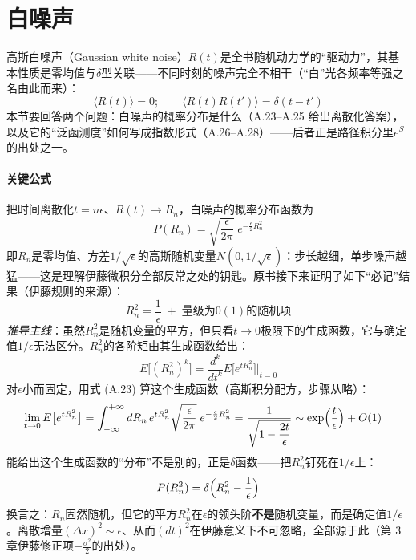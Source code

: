 \section{白噪声}

高斯白噪声（Gaussian white noise）$R(t)$是全书随机动力学的“驱动力”，其基本性质是零均值与$\delta$型关联——不同时刻的噪声完全不相干（“白”光各频率等强之名由此而来）：
\begin{equation*}
\langle R(t)\rangle=0;\qquad
\langle R(t)R(t')\rangle=\delta(t-t')
\end{equation*}
本节要回答两个问题：白噪声的概率分布是什么（A.23--A.25 给出离散化答案），以及它的“泛函测度”如何写成指数形式（A.26--A.28）——后者正是路径积分里$e^{S}$的出处之一。

\paragraph{关键公式}
把时间离散化$t=n\epsilon$、$R(t)\to R_n$，白噪声的概率分布函数为
\begin{equation*}
P(R_n)=\sqrt{\frac{\epsilon}{2\pi}}\;e^{-\frac{\epsilon}{2}R_n^2}
\tag{A.23}
\end{equation*}
即$R_n$是零均值、方差$1/\sqrt{\epsilon}$的高斯随机变量$N(0,1/\sqrt{\epsilon})$：步长越细，单步噪声越猛——这是理解伊藤微积分全部反常之处的钥匙。原书接下来证明了如下“必记”结果（伊藤规则的来源）：
\begin{equation*}
R_n^2=\frac{1}{\epsilon}\;+\;\text{量级为}0(1)\text{的随机项}
\tag{A.24}
\end{equation*}
\emph{推导主线}：虽然$R_n^2$是随机变量的平方，但只看$t\to0$极限下的生成函数，它与确定值$1/\epsilon$无法区分。$R_n^2$的各阶矩由其生成函数给出：
\begin{equation*}
E\bigl[(R_n^2)^k\bigr]=\frac{d^k}{dt^k}E\bigl[e^{tR_n^2}\bigr]\Bigr|_{t=0}
\end{equation*}
对$\epsilon$小而固定，用式 (A.23) 算这个生成函数（高斯积分配方，步骤从略）：
\begin{align*}
\lim_{t\to 0}E\bigl[e^{tR_n^2}\bigr]
&=\int_{-\infty}^{+\infty}dR_n\,e^{tR_n^2}
\sqrt{\frac{\epsilon}{2\pi}}\;e^{-\frac{\epsilon}{2}R_n^2}
=\frac{1}{\sqrt{1-\dfrac{2t}{\epsilon}}}
\sim\exp\Bigl(\frac{t}{\epsilon}\Bigr)+O(1)
\end{align*}
能给出这个生成函数的“分布”不是别的，正是$\delta$函数——把$R_n^2$钉死在$1/\epsilon$上：
\begin{equation*}
P(R_n^2)=\delta\Bigl(R_n^2-\frac{1}{\epsilon}\Bigr)
\end{equation*}
换言之：$R_n$固然随机，但它的平方$R_n^2$在$\epsilon$的领头阶\textbf{不是}随机变量，而是确定值$1/\epsilon$。离散增量$(\Delta x)^2\sim\epsilon$、从而$(dt)^2$在伊藤意义下不可忽略，全部源于此（第 3 章伊藤修正项$-\frac{\sigma^2}{2}$的出处）。

